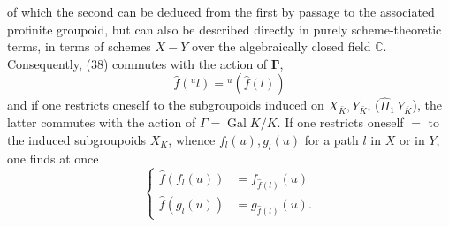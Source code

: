 of which the second can be deduced from the first by passage to the associated profinite groupoid, but can also be described directly in purely scheme-theoretic terms, in terms  of schemes  $X\mathbin{-}Y$ over the algebraically closed field $\mathbb C$. Consequently, (38) commutes with the action of $\mathbf{\Gamma}$,
\[
\tag{39}\widehat f({}^ul)={}^u(\widehat f(l))
\]
and if one restricts oneself to the subgroupoids induced on $X_{\bar K},Y_{\bar K}$,  ($\widehat\Pi_1\,Y_{\bar K}$), the latter commutes with the action of $\Gamma=\operatorname{Gal}\bar K/K$. If one restricts oneself $=$ to the induced subgroupoids $X_K$, whence $f_l(u),g_l(u)$ for a path $l$ in $X$ or in $Y$, one finds at once
\[
\tag{40}\left\{\begin{aligned}
\widehat f(f_l(u))&=f_{\widehat f(l)}(u)\\
\widehat f(g_l(u))&=g_{\widehat f(l)}(u).
\end{aligned}\right.
\]
